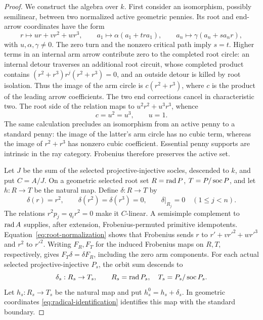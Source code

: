 \begin{proof}
We construct the algebra over $k$. First consider an isomorphism, possibly semilinear, between two normalized active geometric pennies. Its root and end-arrow coordinates have the form
\[
 r\longmapsto ur+vr^2+wr^3,\qquad
 a_1\longmapsto\alpha(a_1+tra_1),\qquad
 a_n\longmapsto\gamma(a_n+sa_nr),
\]
with $u,\alpha,\gamma\ne0$. The zero turn and the nonzero critical path imply $s=t$. Higher terms in an internal arm arrow contribute zero to the completed root circle: an internal detour traverses an additional root circuit, whose completed product contains
$(r^2+r^3)r^j(r^2+r^3)=0$, and an outside detour is killed by root isolation. Thus the image of the arm circle is $c(r^2+r^3)$, where $c$ is the product of the leading arrow coefficients. The two end corrections cancel in characteristic two. The root side of the relation maps to $u^2r^2+u^3r^3$, whence
\begin{equation}\label{eq:root-normalization}
 c=u^2=u^3,\qquad u=1.
\end{equation}
The same calculation precludes an isomorphism from an active penny to a standard penny: the image of the latter's arm circle has no cubic term, whereas the image of $r^2+r^3$ has nonzero cubic coefficient. Essential penny supports are intrinsic in the ray category. Frobenius therefore preserves the active set.

Let $J$ be the sum of the selected projective-injective socles, descended to $k$, and put $C=A/J$. On a geometric selected root set $R=\operatorname{rad} P$, $T=P/\operatorname{soc} P$, and let $h:R\to T$ be the natural map. Define $\delta:R\to T$ by
\[
 \delta(r)=r^2,\qquad \delta(r^2)=\delta(r^3)=0,
 \qquad \delta|_{R_j}=0\quad(1\le j<n).
\]
The relations $r^2p_j=q_ir^2=0$ make it $C$-linear. A semisimple complement to $\operatorname{rad} A$ supplies, after extension, Frobenius-permuted primitive idempotents. Equation~\eqref{eq:root-normalization} shows that Frobenius sends $r$ to $r'+vr'^2+wr'^3$ and $r^2$ to $r'^2$. Writing $F_R,F_T$ for the induced Frobenius maps on $R,T$, respectively, gives $F_T\delta=\delta F_R$, including the zero arm components. For each actual selected projective-injective $P_s$, the orbit sum descends to
\[
 \delta_s:R_s\to T_s,\qquad R_s=\operatorname{rad} P_s,\quad T_s=P_s/\operatorname{soc} P_s.
\]
Let $h_s:R_s\to T_s$ be the natural map and put $h_s^0=h_s+\delta_s$. In geometric coordinates \eqref{eq:radical-identification} identifies this map with the standard boundary.


\end{proof}
